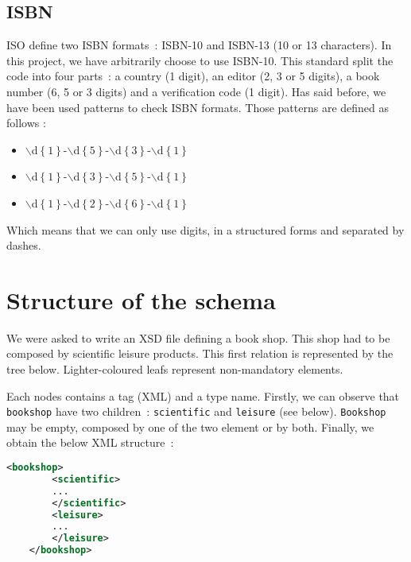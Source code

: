 \documentclass{article}
\begin{document}
  \subsection{ISBN}
    \label{sec:isbn}
    ISO define two ISBN formats~: ISBN-10 and ISBN-13 (10 or 13 characters). In this project, we have arbitrarily choose to use ISBN-10. This standard split the code into four parts~: a country (1 digit), an editor (2, 3 or 5 digits), a book number (6, 5 or 3 digits) and a verification code (1 digit). Has said before, we have been used patterns to check ISBN formats. Those patterns are defined as follows : 
    \begin{itemize}
    \item $\backslash$d$\left\{ 1\right\}$-$\backslash$d$\left\{ 5 \right\}$-$\backslash$d$\left\{ 3 \right\}$-$\backslash$d$\left\{ 1 \right\}$
    \item $\backslash$d$\left\{ 1 \right\}$-$\backslash$d$\left\{ 3 \right\}$-$\backslash$d$\left\{ 5 \right\}$-$\backslash$d$\left\{ 1 \right\}$
    \item $\backslash$d$\left\{ 1 \right\}$-$\backslash$d$\left\{ 2 \right\}$-$\backslash$d$\left\{ 6 \right\}$-$\backslash$d$\left\{ 1 \right\}$
    \end{itemize}
    Which means that we can only use digits, in a structured forms and separated by dashes.
  
  
\section{Structure of the schema}
We were asked to write an XSD file defining a book shop. This shop had to be composed by scientific leisure products. This first relation is represented by the tree below. Lighter-coloured leafs represent non-mandatory elements.
  \begin{center}
  \end{center}
  Each nodes contains a tag (XML) and a type name. Firstly, we can observe that \verb|bookshop| have two children~: \verb|scientific| and \verb|leisure| (see below). \verb|Bookshop| may be empty, composed by one of the two element or by both. Finally, we obtain the below XML structure~:
  \begin{lstlisting}[language=XML]
    <bookshop>
        <scientific>
	    ...
        </scientific>
        <leisure>
	    ...
        </leisure>
    </bookshop>
  \end{lstlisting}
\end{document}
